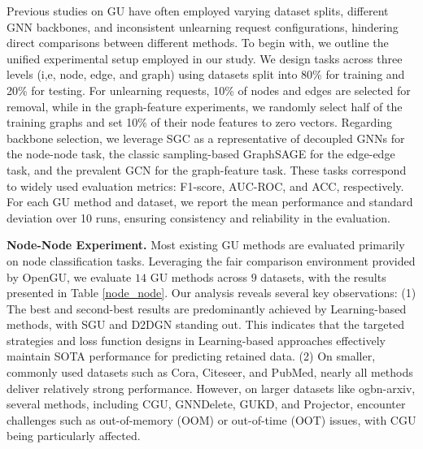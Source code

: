 Previous studies on GU have often employed varying dataset splits, different GNN backbones, and inconsistent unlearning request configurations, hindering direct comparisons between different methods. To begin with, we outline the unified experimental setup employed in our study. We design tasks across three levels (i,e, node, edge, and graph) using datasets split into 80\% for training and 20\% for testing. For unlearning requests, 10\% of nodes and edges are selected for removal, while in the graph-feature experiments, we randomly select half of the training graphs and set 10\% of their node features to zero vectors. Regarding backbone selection, we leverage SGC as a representative of decoupled GNNs for the node-node task, the classic sampling-based GraphSAGE for the edge-edge task, and the prevalent GCN for the graph-feature task. These tasks correspond to widely used evaluation metrics: F1-score, AUC-ROC, and ACC, respectively. 
For each GU method and dataset, we report the mean performance and standard deviation over 10 runs, ensuring consistency and reliability in the evaluation.



\textbf{Node-Node Experiment.} 
Most existing GU methods are evaluated primarily on node classification tasks. Leveraging the fair comparison environment provided by OpenGU, we evaluate $14$ GU methods across $9$ datasets, with the results presented in Table \ref{node_node}. Our analysis reveals several key observations: (1) The best and second-best results are predominantly achieved by Learning-based methods, with SGU and D2DGN standing out. This indicates that the targeted strategies and loss function designs in Learning-based approaches effectively maintain SOTA performance for predicting retained data.
(2) On smaller, commonly used datasets such as Cora, Citeseer, and PubMed, nearly all methods deliver relatively strong performance. 
However, on larger datasets like ogbn-arxiv, several methods, including CGU, GNNDelete, GUKD, and Projector, encounter challenges such as out-of-memory (OOM) or out-of-time (OOT) issues, with CGU being particularly affected. 




